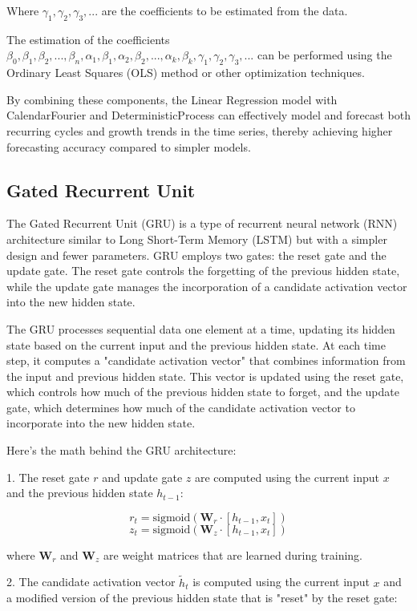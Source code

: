 \documentclass{ieeeojies}
\begin{document}
Where $\gamma_1, \gamma_2, \gamma_3, ...$ are the coefficients to be estimated from the data.

The estimation of the coefficients $\beta_0, \beta_1, \beta_2, ..., \beta_n, \alpha_1, \beta_1, \alpha_2, \beta_2, ..., \alpha_k, \beta_k, \gamma_1, \gamma_2, \gamma_3, ...$ can be performed using the Ordinary Least Squares (OLS) method or other optimization techniques.

 By combining these components, the Linear Regression model with CalendarFourier and DeterministicProcess can effectively model and forecast both recurring cycles and growth trends in the time series, thereby achieving higher forecasting accuracy compared to simpler models. 
 
 \subsection{Gated Recurrent Unit}
 The Gated Recurrent Unit (GRU) is a type of recurrent neural network (RNN) architecture similar to Long Short-Term Memory (LSTM) but with a simpler design and fewer parameters. GRU employs two gates: the reset gate and the update gate. The reset gate controls the forgetting of the previous hidden state, while the update gate manages the incorporation of a candidate activation vector into the new hidden state.

 The GRU processes sequential data one element at a time, updating its hidden state based on the current input and the previous hidden state. At each time step, it computes a "candidate activation vector" that combines information from the input and previous hidden state. This vector is updated using the reset gate, which controls how much of the previous hidden state to forget, and the update gate, which determines how much of the candidate activation vector to incorporate into the new hidden state.

 Here’s the math behind the GRU architecture:

 1. The reset gate \( r \) and update gate \( z \) are computed using the current input \( x \) and the previous hidden state \( h_{t-1} \):

 \[
  r_t = \text{sigmoid}(\mathbf{W}_r \cdot [h_{t-1}, x_t])
  \]
  \[
  z_t = \text{sigmoid}(\mathbf{W}_z \cdot [h_{t-1}, x_t])
  \]

where \( \mathbf{W}_r \) and \( \mathbf{W}_z \) are weight matrices that are learned during training.

 2. The candidate activation vector \( \tilde{h}_t \) is computed using the current input \( x \) and a modified version of the previous hidden state that is "reset" by the reset gate:
\end{document}
